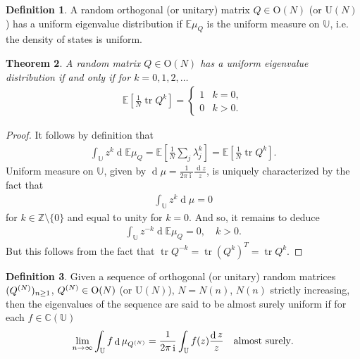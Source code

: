 \documentclass{amsart}
\newtheorem{theorem}{Theorem}[section]
\theoremstyle{definition}
\newtheorem{definition}[theorem]{Definition}
\theoremstyle{remark}
\numberwithin{equation}{section}
\DeclareMathOperator{\D}{d}
\DeclareMathOperator{\tr}{tr}
\DeclareMathOperator{\I}{i}
\begin{document}
\begin{definition}
A random orthogonal (or unitary) matrix $Q \in \mathrm{O}(N)$ (or $\mathrm{U}(N)$) has a uniform eigenvalue distribution if $\mathbb E \mu_Q$ is the uniform measure on $\mathbb U$, i.e. the density of states is uniform.
\end{definition}

\begin{theorem}
A random matrix $Q \in \mathrm O(N)$ has a uniform eigenvalue distribution if and only if for $k = 0,1,2,\ldots$
\begin{align}
\mathbb E \left[ \frac{1}{N} \tr Q^k \right] = \begin{cases} 1 & k = 0,\\
0 & k > 0.\end{cases}
\end{align}
\end{theorem}
\begin{proof}
It follows by definition that
\begin{align}
\int_{\mathbb U} z^k \D \mathbb E \mu_Q = \mathbb E \left[\frac{1}{N} \sum_j \lambda_j^k \right] = \mathbb E\left[ \frac{1}{N} \tr Q^k \right].
\end{align}
Uniform measure on $\mathbb U$, given by $\D \mu = \frac{1}{2\pi \I} \frac{\D z}{z}$, is uniquely characterized by the fact that
\begin{align}
\int_{\mathbb U} z^k \D \mu = 0
\end{align}
for $k \in \mathbb Z \setminus \{0\}$ and equal to unity for $k = 0$.  And so, it remains to deduce
\begin{align}
\int_{\mathbb U} z^{-k} \D \mathbb E \mu_Q = 0, \quad k > 0.
\end{align}
But this follows from the fact that $\tr Q^{-k} = \tr (Q^k)^T = \tr Q^k$.
\end{proof}
\begin{definition}
Given a sequence of orthogonal (or unitary) random matrices $(Q^{(N)})_{n \geq 1}$, $Q^{(N)} \in \mathrm O(N)$ (or $\mathrm{U}(N)$), $N = N(n)$, $N(n)$ strictly increasing, then the eigenvalues of the sequence are said to be almost surely uniform if for each $f \in \mathbb C(\mathbb U)$
\begin{align}
\lim_{n \to \infty} \int_{\mathbb U} f \D \mu_{Q\pp N}  = \frac{1}{2 \pi \I}\int_{\mathbb U} f(z) \frac{\D z}{z} \quad \text{almost surely}.
\end{align}
\end{definition}
\end{document}
